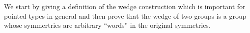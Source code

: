 


We start by giving a definition of the wedge construction which is important for pointed types in general and then prove that the wedge of two groups is a group whose symmertries are arbitrary ``words'' in the original symmetries.

